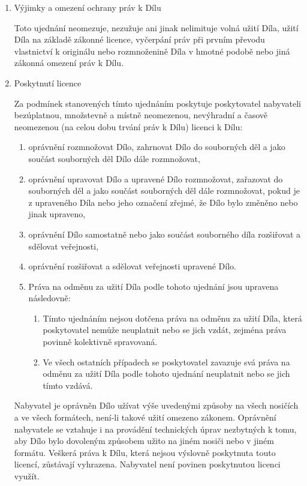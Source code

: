 \begin{enumerate}
  \item Výjimky a omezení ochrany práv k Dílu


Toto ujednání neomezuje, nezužuje ani jinak nelimituje volná užití Díla, užití Díla na základě zákonné licence, vyčerpání práv při prvním převodu vlastnictví k originálu nebo rozmnoženině Díla v hmotné podobě nebo jiná zákonná omezení práv k Dílu.

  \item Poskytnutí licence

Za podmínek stanovených tímto ujednáním poskytuje poskytovatel nabyvateli bezúplatnou, množstevně a místně neomezenou, nevýhradní a časově neomezenou (na celou dobu trvání práv k Dílu) licenci k Dílu:
    \begin{enumerate}
      \item oprávnění rozmnožovat Dílo, zahrnovat Dílo do souborných děl a jako součást souborných děl Dílo dále rozmnožovat,
      \item oprávnění upravovat Dílo a upravené Dílo rozmnožovat, zařazovat do souborných děl a jako součást souborných děl dále rozmnožovat, pokud je z upraveného Díla nebo jeho označení zřejmé, že Dílo bylo změněno nebo jinak upraveno,
      \item oprávnění Dílo samostatně nebo jako součást souborného díla rozšiřovat a sdělovat veřejnosti,
      \item oprávnění rozšiřovat a sdělovat veřejnosti upravené Dílo.
      \item Práva na odměnu za užití Díla podle tohoto ujednání jsou upravena následovně:
        \begin{enumerate}
          \item Tímto ujednáním nejsou dotčena práva na odměnu za užití Díla, která poskytovatel nemůže neuplatnit nebo se jich vzdát, zejména práva povinně kolektivně spravovaná.
          \item Ve všech ostatních případech se poskytovatel zavazuje svá práva na odměnu za užití Díla podle tohoto ujednání neuplatnit nebo se jich tímto vzdává.
        \end{enumerate}
    \end{enumerate}
Nabyvatel je oprávněn Dílo užívat výše uvedenými způsoby na všech nosičích a ve všech formátech, není-li takové užití omezeno zákonem. Oprávnění nabyvatele se vztahuje i na provádění technických úprav nezbytných k tomu, aby Dílo bylo dovoleným způsobem užito na jiném nosiči nebo v jiném formátu. Veškerá práva k Dílu, která nejsou výslovně poskytnuta touto licencí, zůstávají vyhrazena. Nabyvatel není povinen poskytnutou licenci využít.


\end{enumerate}
